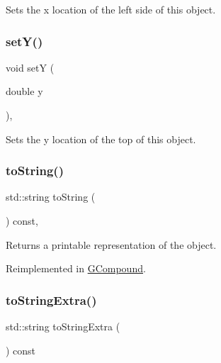 Sets the x location of the left side of this object. 

\mbox{\label{classGObject_a7d57e2a5c35d27feb58fd498a3cf82b9}} 
\subsubsection{\texorpdfstring{set\+Y()}{setY()}}
{\footnotesize\ttfamily void setY (\begin{DoxyParamCaption}\item[{double}]{y }\end{DoxyParamCaption})\hspace{0.3cm}{\ttfamily [virtual]}, {\ttfamily [inherited]}}



Sets the y location of the top of this object. 

\mbox{\label{classGObject_a1fe5121d6528fdea3f243321b3fa3a49}} 
\subsubsection{\texorpdfstring{to\+String()}{toString()}}
{\footnotesize\ttfamily std\+::string to\+String (\begin{DoxyParamCaption}{ }\end{DoxyParamCaption}) const\hspace{0.3cm}{\ttfamily [virtual]}, {\ttfamily [inherited]}}



Returns a printable representation of the object. 



Reimplemented in \mbox{\hyperlink{classGCompound_add86bda25fd0c3b8edaedee9431b85e6}{G\+Compound}}.

\mbox{\label{classGText_a85b5bcebac42ec5f130b0c3851383a23}} 
\subsubsection{\texorpdfstring{to\+String\+Extra()}{toStringExtra()}}
{\footnotesize\ttfamily std\+::string to\+String\+Extra (\begin{DoxyParamCaption}{ }\end{DoxyParamCaption}) const\hspace{0.3cm}{\ttfamily [virtual]}}



